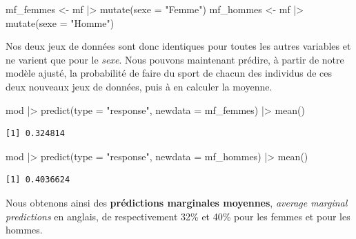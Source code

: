\documentclass[
  letterpaper,
  DIV=11,
  numbers=noendperiod,
  oneside]{scrreprt}
\newenvironment{Shaded}{\begin{snugshade}}{\end{snugshade}}
\newcommand{\AttributeTok}[1]{\textcolor[rgb]{0.40,0.45,0.13}{#1}}
\newcommand{\FunctionTok}[1]{\textcolor[rgb]{0.28,0.35,0.67}{#1}}
\newcommand{\NormalTok}[1]{\textcolor[rgb]{0.00,0.23,0.31}{#1}}
\newcommand{\OtherTok}[1]{\textcolor[rgb]{0.00,0.23,0.31}{#1}}
\newcommand{\SpecialCharTok}[1]{\textcolor[rgb]{0.37,0.37,0.37}{#1}}
\newcommand{\StringTok}[1]{\textcolor[rgb]{0.13,0.47,0.30}{#1}}
\begin{document}
\begin{Shaded}
\begin{Highlighting}[]
\NormalTok{mf\_femmes }\OtherTok{\textless{}{-}}\NormalTok{ mf }\SpecialCharTok{|\textgreater{}} \FunctionTok{mutate}\NormalTok{(}\AttributeTok{sexe =} \StringTok{"Femme"}\NormalTok{)}
\NormalTok{mf\_hommes }\OtherTok{\textless{}{-}}\NormalTok{ mf }\SpecialCharTok{|\textgreater{}} \FunctionTok{mutate}\NormalTok{(}\AttributeTok{sexe =} \StringTok{"Homme"}\NormalTok{)}
\end{Highlighting}
\end{Shaded}

Nos deux jeux de données sont donc identiques pour toutes les autres
variables et ne varient que pour le \emph{sexe}. Nous pouvons maintenant
prédire, à partir de notre modèle ajusté, la probabilité de faire du
sport de chacun des individus de ces deux nouveaux jeux de données, puis
à en calculer la moyenne.

\begin{Shaded}
\begin{Highlighting}[]
\NormalTok{mod }\SpecialCharTok{|\textgreater{}} \FunctionTok{predict}\NormalTok{(}\AttributeTok{type =} \StringTok{"response"}\NormalTok{, }\AttributeTok{newdata =}\NormalTok{ mf\_femmes) }\SpecialCharTok{|\textgreater{}} \FunctionTok{mean}\NormalTok{()}
\end{Highlighting}
\end{Shaded}

\begin{verbatim}
[1] 0.324814
\end{verbatim}

\begin{Shaded}
\begin{Highlighting}[]
\NormalTok{mod }\SpecialCharTok{|\textgreater{}} \FunctionTok{predict}\NormalTok{(}\AttributeTok{type =} \StringTok{"response"}\NormalTok{, }\AttributeTok{newdata =}\NormalTok{ mf\_hommes) }\SpecialCharTok{|\textgreater{}} \FunctionTok{mean}\NormalTok{()}
\end{Highlighting}
\end{Shaded}

\begin{verbatim}
[1] 0.4036624
\end{verbatim}

Nous obtenons ainsi des \textbf{prédictions marginales moyennes},
\emph{average marginal predictions} en anglais, de respectivement 32\%
et 40\% pour les femmes et pour les hommes.
\end{document}
